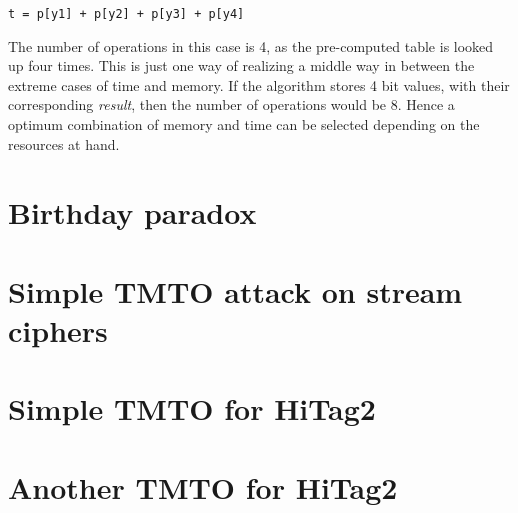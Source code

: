 \begin{verbatim}
t = p[y1] + p[y2] + p[y3] + p[y4]
\end{verbatim}

The number of operations in this case is 4, as the pre-computed table is looked up four times. This is just one way of realizing a middle way in between the extreme cases of time and memory. If the algorithm stores 4 bit values, with their corresponding \textit{result}, then the number of operations would be 8. Hence a optimum combination of memory and time can be selected depending on the resources at hand. 

\section{Birthday paradox}





\section{Simple TMTO attack on stream ciphers}

\section{Simple TMTO for HiTag2}

\section{Another TMTO for HiTag2}

